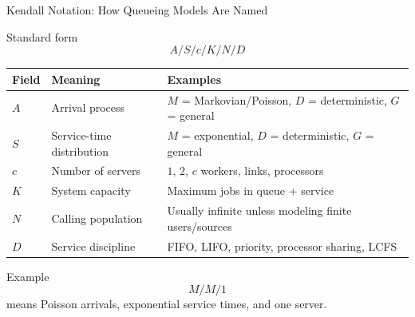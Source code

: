 \documentclass[aspectratio=169]{beamer}
\begin{document}
\begin{frame}{Kendall Notation: How Queueing Models Are Named}
\scriptsize

\begin{block}{Standard form}
\[
A/S/c/K/N/D
\]
\end{block}

\begin{center}
\begin{tabular}{p{1.5cm} p{3.2cm} p{6.0cm}}
\toprule
\textbf{Field} & \textbf{Meaning} & \textbf{Examples} \\
\midrule
$A$ & Arrival process & $M$ = Markovian/Poisson, $D$ = deterministic, $G$ = general \\
$S$ & Service-time distribution & $M$ = exponential, $D$ = deterministic, $G$ = general \\
$c$ & Number of servers & $1$, $2$, $c$ workers, links, processors \\
$K$ & System capacity & Maximum jobs in queue + service \\
$N$ & Calling population & Usually infinite unless modeling finite users/sources \\
$D$ & Service discipline & FIFO, LIFO, priority, processor sharing, LCFS \\
\bottomrule
\end{tabular}
\end{center}

\begin{exampleblock}{Example}
\[
M/M/1
\]
means Poisson arrivals, exponential service times, and one server.
\end{exampleblock}

\end{frame}
\end{document}
